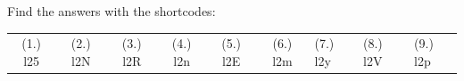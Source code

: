   \label{m38819**end}
  \label{59e414b70efc194a27a122db47d06ce6**end}
\par {} Find the answers with the shortcodes:
 \par \begin{tabular}[h]{cccccc}
 (1.) l25  &  (2.) l2N  &  (3.) l2R  &  (4.) l2n  &  (5.) l2E  &  (6.) l2m  &  (7.) l2y  &  (8.) l2V  &  (9.) l2p  & \end{tabular}
